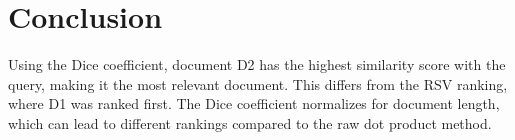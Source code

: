\documentclass{article}
\begin{document}
\section{Conclusion}
Using the Dice coefficient, document D2 has the highest similarity score with the query, making it the most relevant document. This differs from the RSV ranking, where D1 was ranked first. The Dice coefficient normalizes for document length, which can lead to different rankings compared to the raw dot product method.
\end{document}
